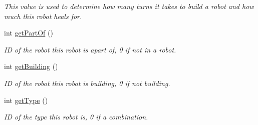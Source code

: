 \begin{DoxyCompactItemize}
\begin{DoxyCompactList}\small\item\em This value is used to determine how many turns it takes to build a robot and how much this robot heals for. \item\end{DoxyCompactList}\item 
\hypertarget{classBot_a94c11e4b01fab1e525e349ee6e005086}{
int \hyperlink{classBot_a94c11e4b01fab1e525e349ee6e005086}{getPartOf} ()}
\label{classBot_a94c11e4b01fab1e525e349ee6e005086}

\begin{DoxyCompactList}\small\item\em ID of the robot this robot is apart of, 0 if not in a robot. \item\end{DoxyCompactList}\item 
\hypertarget{classBot_aafce1528acee7093c42c5221086c0ce4}{
int \hyperlink{classBot_aafce1528acee7093c42c5221086c0ce4}{getBuilding} ()}
\label{classBot_aafce1528acee7093c42c5221086c0ce4}

\begin{DoxyCompactList}\small\item\em ID of the robot this robot is building, 0 if not building. \item\end{DoxyCompactList}\item 
\hypertarget{classBot_a2571c8d19c65942ccc7eeebe8b056b9d}{
int \hyperlink{classBot_a2571c8d19c65942ccc7eeebe8b056b9d}{getType} ()}
\label{classBot_a2571c8d19c65942ccc7eeebe8b056b9d}

\begin{DoxyCompactList}\small\item\em ID of the type this robot is, 0 if a combination. \item\end{DoxyCompactList}\end{DoxyCompactItemize}
